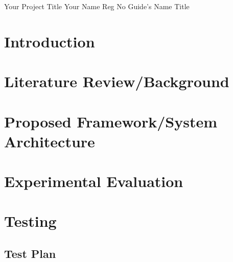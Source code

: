 \documentclass{vitmsprojectreport}
\begin{document}
\maketitlepage%
{Your Project Title}%
{Your Name}%
{Reg No}%
{Guide's Name}%
{Title}%

\makedeclarationpage%

\makebonafidepage%

\makeackpage%

\makeexecsummarypage%

\tableofcontents  %
\clearpage
\listoffigures    %
\clearpage
\listoftables     %
\clearpage


\chapter{Introduction}

\chapter{Literature Review/Background}

\chapter{Proposed Framework/System Architecture}

\chapter{Experimental Evaluation}

\chapter{Testing}

\section{Test Plan}
\end{document}
